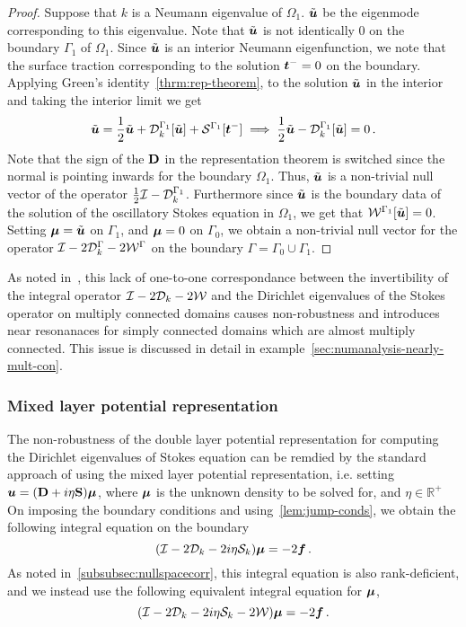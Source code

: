 \begin{proof}
Suppose that $k$ is a Neumann eigenvalue of $\Omega_{1}$. 
$\tilde{{\boldsymbol u}}$ be the eigenmode corresponding to this eigenvalue. 
Note that $\tilde{{\boldsymbol u}}$ is not identically $0$ on the boundary $\Gamma_{1}$
of $\Omega_{1}$.
Since $\tilde{{\boldsymbol u}}$ is an interior Neumann eigenfunction, we note that
the surface traction corresponding to the solution ${\boldsymbol t}^{-} = 0$
on the boundary.
Applying Green's identity~\cref{thrm:rep-theorem}, to the solution 
$\tilde{{\boldsymbol u}}$ in the interior and taking the interior limit we get
\begin{equation}
\tilde{{\boldsymbol u}} = \frac{1}{2}\tilde{{\boldsymbol u}} + {\mathcal D}^{\Gamma_{1}}_{k}[\tilde{{\boldsymbol u}}] +
{\mathcal S}^{\Gamma_{1}} [{\boldsymbol t}^{-}] \implies \frac{1}{2} \tilde{{\boldsymbol u}} - {\mathcal D}^{\Gamma_{1}}_{k}[\tilde{{\boldsymbol u}}]
= 0\, .
\end{equation}
Note that the sign of the ${\bf D}$ in the representation theorem is switched
since the normal is pointing inwards for the boundary $\Omega_{1}$.
Thus, $\tilde{{\boldsymbol u}}$ is a non-trivial null vector of the operator 
$\frac{1}{2}\mathcal I - {\mathcal D}^{\Gamma_{1}}_{k}$. 
Furthermore since $\tilde{{\boldsymbol u}}$ is the boundary data of 
the solution of the oscillatory Stokes equation in $\Omega_{1}$, we
get that ${\mathcal W}^{\Gamma_{1}}[\tilde{{\boldsymbol u}}] = 0$.
Setting ${\boldsymbol \mu} = \tilde{{\boldsymbol u}}$ on $\Gamma_{1}$, and ${\boldsymbol \mu} = 0$ on $\Gamma_{0}$,
we obtain a non-trivial null vector for the operator $\mathcal I - 2{\mathcal D}^{\Gamma}_{k} -2{\mathcal W}^{\Gamma}$
on the boundary $\Gamma = \Gamma_{0} \cup \Gamma_{1}$.
\end{proof}

As noted in~\cite{zhao2015robust}, this lack of one-to-one correspondance between
the invertibility of the integral operator $\mathcal I - 2{\mathcal D}_{k} - 2{\mathcal W}$
and the Dirichlet eigenvalues of the Stokes operator on multiply
connected domains causes non-robustness and introduces near 
resonanaces for simply connected domains
which are almost multiply connected. 
This issue is discussed in detail
in example~\cref{sec:numanalysis-nearly-mult-con}.

\subsubsection{Mixed layer potential representation}
\label{subsec:mixedanalysis}
The non-robustness of the double layer potential representation
for computing the Dirichlet eigenvalues of Stokes equation can be remdied
by the standard approach of using the mixed layer potential representation,
i.e. setting
${\boldsymbol u} = ({\bf D} + i\eta {\bf S})
{\boldsymbol \mu}$, 
where ${\boldsymbol \mu}$ is the unknown density to be solved for, and $\eta \in \mathbb{R}^{+}$ 
On imposing the boundary conditions and using~\cref{lem:jump-conds}, 
we obtain the following integral equation on the boundary 
\begin{equation}
(\mathcal I - 2{\mathcal D}_{k} - 2i\eta {\mathcal S}_{k}) {\boldsymbol \mu} = -2 {\boldsymbol f} \, . 
\end{equation}
As noted in~\cref{subsubsec:nullspacecorr}, this integral equation 
is also rank-deficient, and we instead use the following 
equivalent integral equation for ${\boldsymbol \mu}$,
\begin{equation}
(\mathcal I - 2{\mathcal D}_{k} -2i\eta {\mathcal S}_{k}  -2{\mathcal W}){\boldsymbol \mu} = -2 {\boldsymbol f} \, .
\end{equation}

